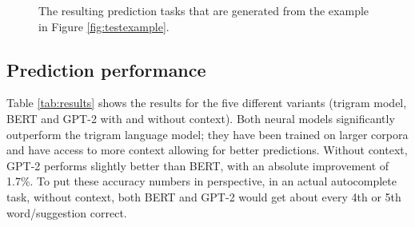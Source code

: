 \documentclass[11pt,a4paper]{article}
\begin{document}
\begin{figure}
\centering
{}
\caption{The resulting prediction tasks that are generated from the example in Figure \ref{fig:testexample}.}
\label{fig:testing}
\vspace{-2mm}
\end{figure}

\begin{table}[t]
\centering
{}
\caption{Accuracy for the different models on the Wikipedia test corpus of 25K sentence pairs.  Context-aware approaches included the context of the difficult sentence when predicting.} 
\label{tab:results}
\vspace{-2mm}
\end{table}

\subsection{Prediction performance}
Table \ref{tab:results} shows the results for the five different variants (trigram model, BERT and GPT-2 with and without context).  Both neural models significantly outperform the trigram language model; they have been trained on larger corpora and have access to more context allowing for better predictions.  Without context, GPT-2 performs slightly better than BERT, with an absolute improvement of 1.7\%.  To put these accuracy numbers in perspective, in an actual autocomplete task, without context, both BERT and GPT-2 would get about every 4th or 5th word/suggestion correct.
\end{document}
